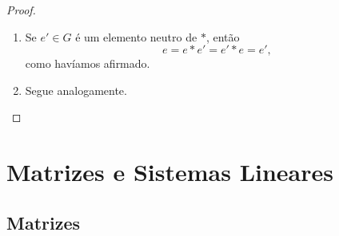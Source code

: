 \begin{proof}
    \leavevmode
        \begin{enumerate}[leftmargin=*, align=left, label=\textbf{(\alph*)}]
            \item Se $e' \in G$ é um elemento neutro de $*$, então
                \[
                    e = e * e' = e' * e = e',
                \]
            como havíamos afirmado. \blackproof
            \item Segue analogamente. \blackproof
        \end{enumerate}
\end{proof}

\chapter{Matrizes e Sistemas Lineares}

\section{Matrizes}


